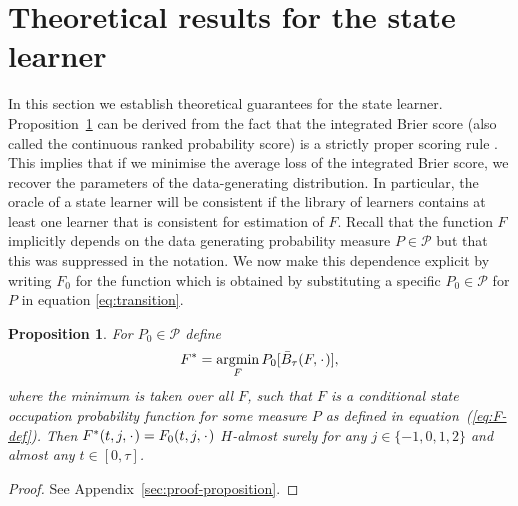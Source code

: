 \documentclass{statsoc}
\newtheorem{proposition}{Proposition}
\DeclareMathOperator{\E}{\mathbb{E}} %
\newcommand{\blank}{\makebox[1ex]{\textbf{$\cdot$}}}
\renewcommand{\phi}{\varphi}
\newcommand{\1}{\mathds{1}}
\DeclareMathOperator*{\argmin}{\arg\!\min}
\begin{document}
\section{Theoretical results for the state learner}
\label{sec:theor-results-prop}

In this section we establish theoretical guarantees for the state learner.
Proposition~\ref{prop:stric-prop} can be derived from the fact that the
integrated Brier score (also called the continuous ranked probability score) is
a strictly proper scoring rule \citep{gneiting2007strictly}. This implies that
if we minimise the average loss of the integrated Brier score, we recover the
parameters of the data-generating distribution. In particular, the oracle of a
state learner will be consistent if the library of learners contains at least
one learner that is consistent for estimation of \( F \). Recall that the
function \(F\) implicitly depends on the data generating probability measure
\(P\in\mathcal P\) but that this was suppressed in the notation. We now make
this dependence explicit by writing \(F_0\) for the function which is obtained
by substituting a specific \(P_0\in\mathcal{P}\) for \(P\) in equation
\eqref{eq:transition}.

\begin{proposition}
  \label{prop:stric-prop}
  For \(P_0\in\mathcal{P}\) define
  \begin{equation*}
    F^* = \argmin_{F} P_0{[\bar{B}_\tau(F, \blank)]},
\end{equation*}
where the minimum is taken over all \( F \), such that \( F \) is a conditional
state occupation probability function for some measure \( P \) as defined in equation~(\ref{eq:F-def}).
Then \( F^*(t,j,\blank) = F_0(t,j,\blank) \) \( H \)-almost surely for
any \( j\in \{-1,0,1,2\} \) and almost any \( t \in [0, \tau]\).
\end{proposition}
\begin{proof}
  See Appendix~\ref{sec:proof-proposition}.
\end{proof}
\end{document}
